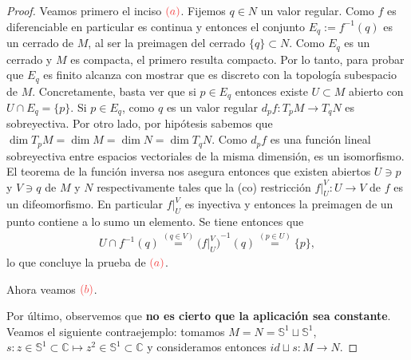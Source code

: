 \documentclass[11pt]{article}
\newcommand{\C}{\mathbb{C}}
\newcommand{\Ss}{\mathbb{S}}
\newcommand{\paint}[2]{\color{#1}{#2}}
\begin{document}
\begin{proof} Veamos primero el inciso $\paint{red}{(a)}$. Fijemos $q \in N$ un valor regular. Como $f$ es diferenciable en particular es continua y entonces el conjunto $E_q := f^{-1}(q)$ es un cerrado de $M$, al ser la preimagen del cerrado $\{q\} \subset N$. Como $E_q$ es un cerrado y $M$ es compacta, el primero resulta compacto. Por lo tanto, para probar que $E_q$ es finito alcanza con mostrar que es discreto con la topolog\'ia subespacio de $M$. Concretamente, basta ver que si $p \in E_q$ entonces existe $U \subset M$ abierto con $U \cap E_q = \{p\}$. Si $p \in E_q$, como $q$ es un valor regular $d_pf :T_pM \to T_qN$ es sobreyectiva. Por otro lado, por hip\'otesis sabemos que $\dim T_pM = \dim M = \dim N = \dim T_qN$. Como $d_pf$ es una funci\'on lineal sobreyectiva entre espacios vectoriales de la misma dimensi\'on, es un isomorfismo. El teorema de la funci\'on inversa nos asegura entonces que existen abiertos $U \ni p$ y $V \ni q$ de $M$ y $N$ respectivamente tales que la (co) restricci\'on $f|_U^V : U \to V$ de $f$ es un difeomorfismo. En particular $f|_U^V$ es inyectiva y entonces la preimagen de un punto contiene a lo sumo un elemento. Se tiene entonces que
\begin{align*}
U \cap f^{-1}(q) \stackrel{(q \in V)}{=} ({f|^V_U)}^{-1}(q) \stackrel{(p \in U)}{=} \{p\},
\end{align*}
lo que concluye la prueba de $\paint{red}{(a)}$. 

Ahora veamos $\paint{red}{(b)}$.

Por \'ultimo, observemos que \textbf{no es cierto que la aplicaci\'on sea constante}. Veamos el siguiente contraejemplo: tomamos $M = N = \Ss^1 \sqcup \Ss^1$, $s : z \in \Ss^1 \subset \C \mapsto z^2 \in \Ss^1 \subset \C$ y consideramos entonces $id \sqcup s : M \to N$. 
\end{proof}
\end{document}
